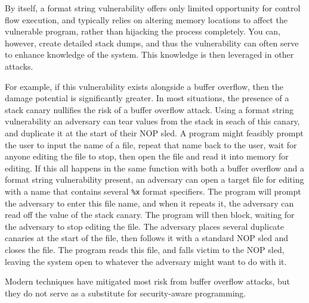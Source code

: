 
By itself, a format string vulnerability offers only limited opportunity for control flow execution, and typically
relies on altering memory locations to affect the vulnerable program, rather than hijacking the process completely. You
can, however, create detailed stack dumps, and thus the vulnerability can often serve to enhance knowledge of the
system. This knowledge is then leveraged in other attacks.


For example, if this vulnerability exists alongside a buffer overflow, then the damage potential is significantly
greater. In most situations, the presence of a stack canary nullifies the risk of a buffer overflow attack. Using a format
string vulnerability an adversary can tear values from the stack in seach of this canary, and duplicate it at the start of their NOP sled.
A program might feasibly prompt the user to input the name of a file, repeat that name back to the user, wait for anyone editing the file to stop, then open the file and read it into memory for editing. If this all happens in the same function with both a buffer overflow and a format string vulnerability
present, an adversary can open a target file for editing with a name that contains several {\tt \%x} format specifiers. The program will prompt the adversary to enter this file name, and when it repeats it, the adversary can read off the value of the stack canary. The program will then block, waiting for the adversary to stop editing the file. The adversary places several duplicate canaries at the start of the file, then follows it with a standard NOP sled and closes the file. The program reads this file, and falls victim to the NOP sled, leaving the system open to whatever the
adversary might want to do with it.

Modern techniques have mitigated most risk from buffer overflow attacks, but they do not serve as a substitute for
security-aware programming.